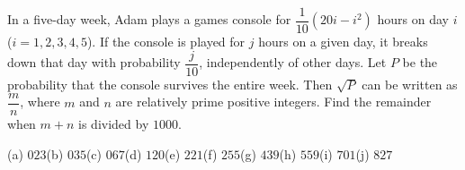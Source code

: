 In a five-day week, Adam plays a games console for $\dfrac{1}{10}\left(20i-i^2\right)$ hours on day $i$ ($i=1,2,3,4,5$). If the console is played for $j$ hours on a given day, it breaks down that day with probability $\dfrac{j}{10}$, independently of other days. Let $P$ be the probability that the console survives the entire week. Then $\sqrt P$ can be written as $\dfrac {m}{n}$, where $m$ and $n$ are relatively prime positive integers. Find the remainder when $m+n$ is divided by $1000$.

(a) $023$\quad (b) $035$\quad (c) $067$\quad (d) $120$\quad (e) $221$\quad (f) $255$\quad (g) $439$\quad (h) $559$\quad (i) $701$\quad (j) $827$
